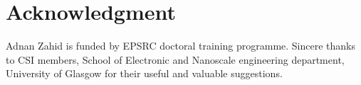 \documentclass[journal,article,submit,moreauthors,pdftex]{Definitions/mdpi}
\renewcommand{\^}{\hat}  %
\begin{document}
%
%





\section*{Acknowledgment}
Adnan Zahid is funded by EPSRC doctoral training programme. Sincere thanks to CSI members, School of Electronic and Nanoscale engineering department, University of Glasgow for their useful and valuable suggestions.
\end{document}
